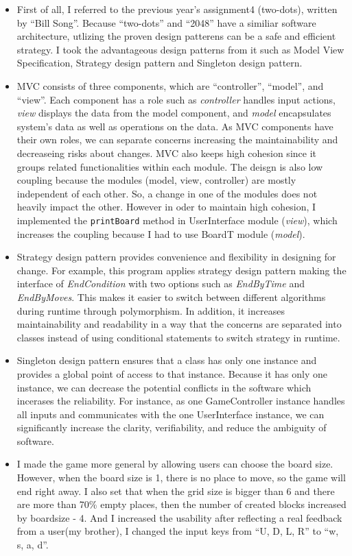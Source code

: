 \documentclass[12pt]{article}
\begin{document}
\begin{itemize}
  \item First of all, I referred to the previous year's assignment4 (two-dots), written by ``Bill Song''. Because ``two-dots'' and ``2048'' have a similiar software architecture, utlizing the proven design patterens can be a safe and efficient strategy. I took the advantageous design patterns from it such as Model View Specification, Strategy design pattern and Singleton design pattern. 
  \item MVC consists of three components, which are ``controller'', ``model'', and ``view''. Each component has a role such as \textit{controller} handles input actions, \textit{view} displays the data from the model component, and \textit{model} encapsulates system's data as well as operations on the data. As MVC components have their own roles, we can separate concerns increasing the maintainability and decreaseing risks about changes. MVC also keeps high cohesion since it groups related functionalities within each module. The deisgn is also low coupling because the modules (model, view, controller) are mostly independent of each other. So, a change in one of the modules does not heavily impact the other. However in oder to maintain high cohesion, I implemented the \verb|printBoard| method in UserInterface module (\textit{view}), which increases the coupling because I had to use BoardT module (\textit{model}).
  \item Strategy design pattern provides convenience and flexibility in designing for change. For example, this program applies strategy design pattern making the interface of \textit{EndCondition} with two options such as \textit{EndByTime} and \textit{EndByMoves}. This makes it easier to switch between different algorithms during runtime through polymorphism. In addition, it increases maintainability and readability in a way that the concerns are separated into classes instead of using conditional statements to switch strategy in runtime.
  \item Singleton design pattern ensures that a class has only one instance and provides a global point of access to that instance. Because it has only one instance, we can decrease the potential conflicts in the software which incerases the reliability. For instance, as one GameController instance handles all inputs and communicates with the one UserInterface instance, we can significantly increase the clarity, verifiability, and reduce the ambiguity of software.
  \item I made the game more general by allowing users can choose the board size. However, when the board size is 1, there is no place to move, so the game will end right away. I also set that when the grid size is bigger than 6 and there are more than 70\% empty places, then the number of created blocks increased by boardsize - 4. And I increased the usability after reflecting a real feedback from a user(my brother), I changed the input keys from ``U, D, L, R'' to ``w, s, a, d''.

\end{itemize}
\end{document}
